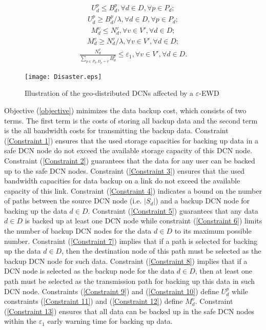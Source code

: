 \documentclass[conference]{IEEEtran}\IEEEoverridecommandlockouts
\begin{document}
 \begin{eqnarray}\label{Constraint 9}
 U_{d}^{p}\leq B_{d}^{p},  \forall d \in D, \forall p \in P_{d};
 \end{eqnarray}
\begin{eqnarray}\label{Constraint 10}
 U_{d}^{p}\geq B_{d}^{p}/\lambda,  \forall d \in D, \forall p \in P_{d};
 \end{eqnarray}
 \begin{eqnarray}\label{Constraint 11}
 M_{d}^{v}\leq N_{d}^{v}, \forall v \in V', \forall d \in D;
 \end{eqnarray}
\begin{eqnarray}\label{Constraint 12}
 M_{d}^{v}\geq N_{d}^{v}/\lambda, \forall v \in V', \forall d \in D;
 \end{eqnarray}
 \begin{eqnarray}\label{Constraint 13}
 \frac{N_{d}^{v}}{\sum\limits_{p \in P_{d}, D_{p}=v }B_{d}^{p}}\leq \varepsilon_{1}, \forall v \in V', \forall d \in D.
 \end{eqnarray}

\begin{figure}[t]
      \centering
      \texttt{[image: Disaster.eps]}
   \caption{Illustration of the geo-distributed DCNs affected by a   $\varepsilon$-EWD}
   \label{fig:Illustration of the affect on geo-distributed DCNs from a disaster}
  \end{figure}

  Objective (\ref{objective}) minimizes the data backup cost, which consists of two terms. The first term is the costs of storing all backup data and the second term is the all bandwidth costs for transmitting the backup data.   Constraint (\ref{Constraint 1}) ensures that the used storage capacities  for backing up data in a safe DCN node do not exceed the available storage capacity of this DCN node. Constraint (\ref{Constraint 2}) guarantees that the data for any user can be backed up to the safe DCN nodes. Constraint (\ref{Constraint 3}) ensures that the used bandwidth capacities for data backup on a link do not exceed the available capacity of this link.  Constraint (\ref{Constraint 4}) indicates a bound on the number of paths between the source DCN node (i.e. $|S_{d}|$) and a  backup DCN node for backing up the data $d \in D$.  Constraint (\ref{Constraint 5}) guarantees that any data $d \in D$ is backed up  at least one DCN node while constraint (\ref{Constraint 6}) limits the number of backup DCN nodes for the data $d \in D$ to its maximum possible number. Constraint (\ref{Constraint 7}) implies that if a path is selected for backing up the data   $d \in D$, then the destination node of this path must be selected as the backup DCN node for such data. Constraint (\ref{Constraint 8}) implies that if a DCN node is selected as the backup node for the data   $d \in D$, then  at least one path  must be selected as the transmission path  for backing up this data  in such DCN node.  Constraints (\ref{Constraint 9}) and (\ref{Constraint 10}) define $U_{d}^{p}$ while constraints (\ref{Constraint 11}) and (\ref{Constraint 12}) define $M_{d}^{v}$.  Constraint (\ref{Constraint 13}) ensures that all data can be backed up in the safe DCN nodes within the $\varepsilon_{1}$ early warning  time for backing up data.
\end{document}
